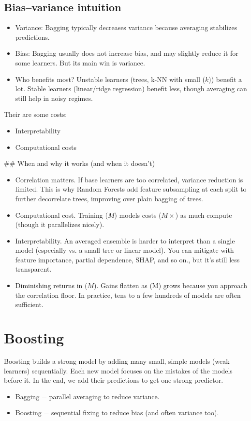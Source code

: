 \subsection{Bias–variance intuition}

\begin{itemize}
	\item Variance: Bagging typically decreases variance because averaging stabilizes predictions.
	\item Bias: Bagging usually does not increase bias, and may slightly reduce it for some learners. But its main win is variance.
	\item Who benefits most? Unstable learners (\eg trees, k-NN with small ($k$)) benefit a lot. Stable learners (\eg linear/ridge regression) benefit less, though averaging can still help in noisy regimes.
\end{itemize}

Their are some costs: 
\begin{itemize}
	\item Interpretability
	\item Computational costs
\end{itemize}

## When and why it works (and when it doesn't)

\begin{itemize}
	\item Correlation matters. If base learners are too correlated, variance reduction is limited. This is why Random Forests add feature subsampling at each split to further decorrelate trees, improving over plain bagging of trees.
	\item Computational cost. Training ($M$) models costs ($M\times$) as much compute (though it parallelizes nicely).
	\item Interpretability. An averaged ensemble is harder to interpret than a single model (especially vs. a small tree or linear model). You can mitigate with feature importance, partial dependence, SHAP, and so on., but it's still less transparent.
	\item Diminishing returns in ($M$). Gains flatten as (M) grows because you approach the correlation floor. In practice, tens to a few hundreds of models are often sufficient.
\end{itemize}

\section{Boosting}

Boosting builds a strong model by adding many small, simple models (weak learners) sequentially. Each new model focuses on the mistakes of the models before it. In the end, we add their predictions to get one strong predictor.

\begin{itemize}
	\item Bagging = parallel averaging to reduce variance.
	\item Boosting = sequential fixing to reduce bias (and often variance too).
\end{itemize}

